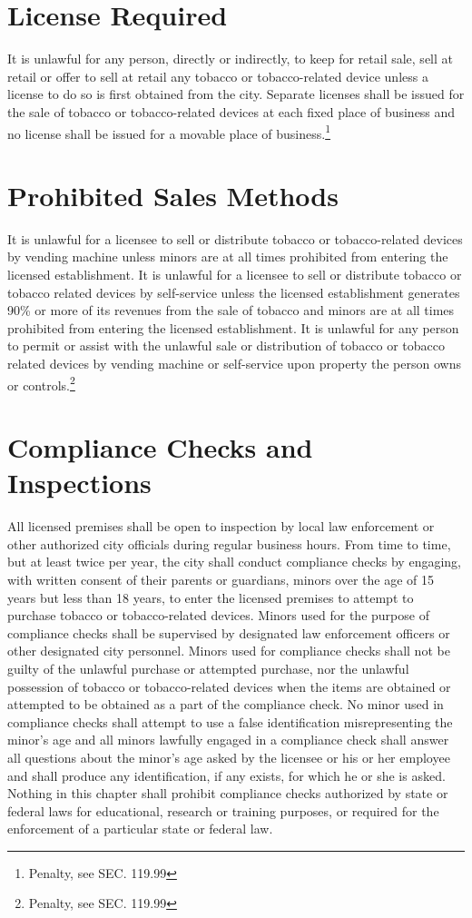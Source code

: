 \section{License Required}
It is unlawful for any person, directly or indirectly, to keep for retail sale, sell at retail or offer to sell at retail any tobacco or tobacco-related device unless a license to do so is first obtained from the city.  Separate licenses shall be issued for the sale of tobacco or tobacco-related devices at each fixed place of business and no license shall be issued for a movable place of business.\footnote{Penalty, see SEC. 119.99}

\section{Prohibited Sales Methods}
It is unlawful for a licensee to sell or distribute tobacco or tobacco-related devices by vending machine unless minors are at all times prohibited from entering the licensed establishment.  It is unlawful for a licensee to sell or distribute tobacco or tobacco related devices by self-service unless the licensed establishment generates 90\% or more of its revenues from the sale of tobacco and minors are at all times prohibited from entering the licensed establishment.  It is unlawful for any person to permit or assist with the unlawful sale or distribution of tobacco or tobacco related devices by vending machine or self-service upon property the person owns or controls.\footnote{Penalty, see SEC. 119.99}

\section{Compliance Checks and Inspections}
All licensed premises shall be open to inspection by local law enforcement or other authorized city officials during regular business hours. From time to time, but at least twice per year, the city shall conduct compliance checks by engaging, with written consent of their parents or guardians, minors over the age of 15 years but less than 18 years, to enter the licensed premises to attempt to purchase tobacco or tobacco-related devices. Minors used for the purpose of compliance checks shall be supervised by designated law enforcement officers or other designated city personnel.  Minors used for compliance checks shall not be guilty of the unlawful purchase or attempted purchase, nor the unlawful possession of tobacco or tobacco-related devices when the items are obtained or attempted to be obtained as a part of the compliance check. No minor used in compliance checks shall attempt to use a false identification misrepresenting the minor’s age and all minors lawfully engaged in a compliance check shall answer all questions about the minor’s age asked by the licensee or his or her employee and shall produce any identification, if any exists, for which he or she is asked.  Nothing in this chapter shall prohibit compliance checks authorized by state or federal laws for educational, research or training purposes, or required for the enforcement of a particular state or federal law.


